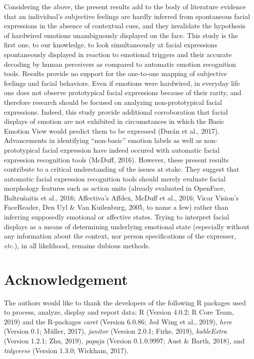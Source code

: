 \documentclass[
  english,
  man]{apa7}
\begin{document}
Considering the above, the present results add to the body of literature evidence that an individual's subjective feelings are hardly inferred from spontaneous facial expressions in the absence of contextual cues, and they invalidate the hypothesis of hardwired emotions unambiguously displayed on the face. This study is the first one, to our knowledge, to look simultaneously at facial expressions spontaneously displayed in reaction to emotional triggers and their accurate decoding by human perceivers as compared to automatic emotion recognition tools. Results provide no support for the one-to-one mapping of subjective feelings and facial behaviors. Even if emotions were hardwired, in everyday life one does not observe prototypical facial expressions because of their rarity, and therefore research should be focused on analyzing non-prototypical facial expressions. Indeed, this study provide additional corroboration that facial displays of emotion are not exhibited in circumstances in which the Basic Emotion View would predict them to be expressed (Durán et al., 2017). Advancements in identifying ``non-basic'' emotion labels as well as non-prototypical facial expression have indeed occured with automatic facial expression recognition tools (McDuff, 2016). However, these present results contribute to a critical understanding of the issues at stake. They suggest that automatic facial expression recognition tools should merely evaluate facial morphology features such as action units (already evaluated in OpenFace, Baltrušaitis et al., 2016; Affectiva's Affdex, McDuff et al., 2016; Vicar Vision's FaceReader, Den Uyl \& Van Kuilenburg, 2005, to name a few) rather than inferring supposedly emotional or affective states. Trying to interpret facial displays as a means of determining underlying emotional state (especially without any information about the context, nor person specifications of the expresser, \emph{etc.}), in all likelihood, remains dubious methods.

\hypertarget{acknowledgement}{%
\section{Acknowledgement}\label{acknowledgement}}

The authors would like to thank the developers of the following R packages used to process, analyze, display and report data: R (Version 4.0.2; R Core Team, 2019) and the R-packages \emph{caret} (Version 6.0.86; Jed Wing et al., 2019), \emph{here} (Version 0.1; Müller, 2017), \emph{janitor} (Version 2.0.1; Firke, 2019), \emph{kableExtra} (Version 1.2.1; Zhu, 2019), \emph{papaja} (Version 0.1.0.9997; Aust \& Barth, 2018), and \emph{tidyverse} (Version 1.3.0; Wickham, 2017).
\end{document}
